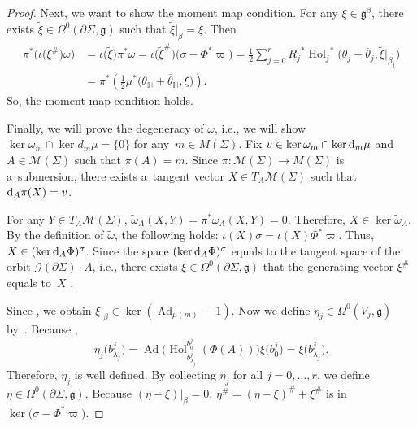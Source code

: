 \documentclass[pdftex]{sigma}
\numberwithin{equation}{section}
\theoremstyle{definition}
\newcommand{\Ad}{\operatorname{Ad}}
\newcommand{\Hol}{\operatorname{Hol}}
\newcommand{\bH}{\mathbb{H}}
\begin{document}
\begin{proof}
 Next, we want to show the moment map condition.
 For any $\xi \in \mathfrak{g}^{\beta}$, there exists $\tilde{\xi} \in \Omega^0(\partial \Sigma,\mathfrak{g})$ such that $\tilde{\xi}|_{\beta} = \xi$.
 Then
 \begin{align*}
 \pi^*\bigl(\iota\bigl(\xi^{\#}\bigr)\omega\bigr) &= \iota\bigl(\tilde{\xi}\bigr) \pi^*\omega
 = \iota\bigl(\tilde{\xi}^{\#}\bigr) \bigl(\sigma-\Phi^*\varpi\bigr)
 = \frac{1}{2} \sum_{j=0}^{r} {R_j}^*{\Hol_j}^*\bigl(\theta_j+ \overline{\theta}_j,\tilde{\xi}|_{\beta_{j}}\bigr)\\
 &= \pi^* \left( \frac{1}{2} \mu^* \bigl(\theta_{\bH} + \overline{\theta}_{\bH},\xi\bigr)\right).
 \end{align*}
 So, the moment map condition holds.

 Finally, we will prove the degeneracy of $\omega$, i.e., we will show $\ker \omega_m \cap \ker d_m \mu = \{0\}$ for any~$m \in M(\Sigma)$.
 Fix $v \in \ker \omega_m \cap \ker {\rm d}_m \mu$ and $A \in \mathcal{M}(\Sigma)$ such that $\pi(A)=m$.
 Since $\pi \colon \mathcal{M}(\Sigma) \to M(\Sigma)$ is a~submersion, there exists a~tangent vector $X \in T_A \mathcal{M}(\Sigma)$ such that ${\rm d}_A\pi(X)=v$.

 For any $Y \in T_A\mathcal{M}(\Sigma)$,
$\tilde{\omega}_A(X,Y) = \pi^*\omega _A(X,Y) = 0$.
 Therefore, $X \in \ker \tilde{\omega}_A$. By the definition of $\tilde{\omega}$, the following holds:
$\iota(X) \sigma= \iota(X) \Phi^*\varpi$.
Thus, $X \in (\ker {\rm d}_A \Phi )^{\sigma}$.
 Since the space $( \ker {\rm d}_A \Phi )^{\sigma}$ equals to the tangent space of the orbit $\mathcal{G}(\partial \Sigma) \cdot A$, i.e., there exists $\xi \in \Omega^0(\partial \Sigma, \mathfrak{g})$ that the generating vector $\xi^{\#}$ equals to~$X$ \cite[Theorem~9.1]{AMM}.

 Since , we obtain
 $\xi|_{\beta} \in \ker(\Ad_{\mu(m)}-1)$.
 Now we define $\eta_j \in \Omega^0(V_j,\mathfrak{g})$ by~\smash{$
 \eta_j(s) := \Ad\bigl(\Hol^{b^{j}_0}_{s}(\Phi(A))^{-1}\bigr)\xi\bigl(b^{j}_0\bigr)$}.
 Because \smash{$\Ad_{\mu(m)}\xi|_{\beta} = \xi|_{\beta}$},
 \[
 \eta_j\bigl(b^{j}_{\lambda_j}\bigr) = \Ad\bigl(\Hol^{b^{j}_0}_{b^{j}_{\lambda_j}}(\Phi(A))\bigr)\xi\bigl(b^{j}_0\bigr) = \xi\bigl(b^{j}_{\lambda_j}\bigr).
 \]
 Therefore, $\eta_j$ is well defined.
 By collecting $\eta_j$ for all $j =0,\dots,r$, we define $\eta \in \Omega^0(\partial \Sigma, \mathfrak{g})$.
 Because $(\eta-\xi)|_{\beta} = 0$, $\eta^{\#} = (\eta - \xi)^{\#} + \xi^{\#}$ is in $\ker\bigl(\sigma- \Phi^* \varpi\bigr)$.


\end{proof}
\end{document}
